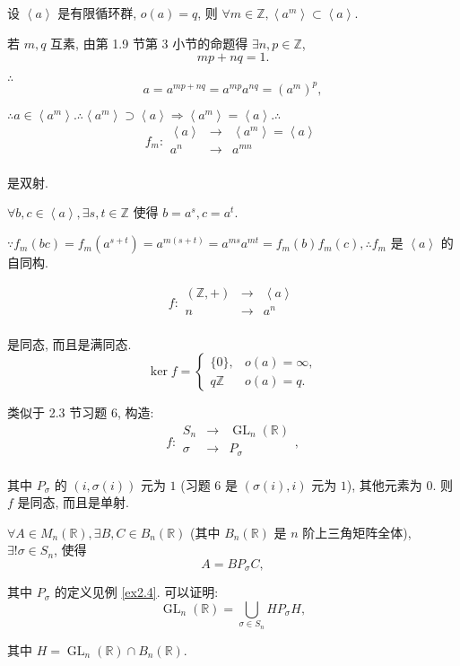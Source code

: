 \documentclass{ctexart}
\begin{document}
\begin{example}
    设 $\left<a\right>$ 是有限循环群, $o(a)=q$, 则 $\forall m\in\mathbb{Z},\left<a^m\right>\subset\left<a\right>$.

    若 $m,q$ 互素, 由第 1.9 节第 3 小节的命题得 $\exists n,p\in\mathbb{Z}$,
    \[mp+nq=1.\]

    $\therefore$
    \[a=a^{mp+nq}=a^{mp}a^{nq}=(a^m)^p,\]

    $\therefore a\in\left<a^m\right>.\therefore\left<a^m\right>\supset\left<a\right>\Rightarrow\left<a^m\right>=\left<a\right>.\therefore$
    \[f_m:\begin{array}{rcl}
        \left<a\right> & \to & \left<a^m\right>=\left<a\right> \\
        a^n & \to & a^{mn} \\
    \end{array}\]

    是双射.

    $\forall b,c\in\left<a\right>,\exists s,t\in\mathbb{Z}$ 使得 $b=a^s,c=a^t$.

    $\because f_m(bc)=f_m(a^{s+t})=a^{m(s+t)}=a^{ms}a^{mt}=f_m(b)f_m(c),\therefore f_m$ 是 $\left<a\right>$ 的自同构.
\end{example}
\begin{example}
    \[f:\begin{array}{rcl}
        (\mathbb{Z},+) & \to & \left<a\right> \\
        n & \to & a^n \\
    \end{array}\]
    
    是同态, 而且是满同态.
    \[\ker f=\begin{cases}
        \{0\}, & o(a)=\infty, \\
        q\mathbb{Z} & o(a)=q.
    \end{cases}\]
\end{example}
\begin{example}\label{ex2.4}
    类似于 2.3 节习题 6, 构造:
    \[f:\begin{array}{rcl}
        S_n & \to & \operatorname{GL}_n(\mathbb{R}) \\
        \sigma & \to & P_\sigma \\
    \end{array},\]

    其中 $P_\sigma$ 的 $(i,\sigma(i))$ 元为 $1$ (习题 6 是 $(\sigma(i),i)$ 元为 $1$), 其他元素为 $0$. 则 $f$ 是同态, 而且是单射.
\end{example}
\begin{example}
    $\forall A\in M_n(\mathbb{R}),\exists B,C\in B_n(\mathbb{R})$ (其中 $B_n(\mathbb{R})$ 是 $n$ 阶上三角矩阵全体), $\exists!\sigma\in S_n$, 使得
    \[A=BP_\sigma C,\]

    其中 $P_\sigma$ 的定义见例 \ref{ex2.4}. 可以证明:
    \[\operatorname{GL}_n(\mathbb{R})=\bigcup\limits_{\sigma\in S_n}HP_\sigma H,\]

    其中 $H=\operatorname{GL}_n(\mathbb{R})\cap B_n(\mathbb{R})$.
\end{example}
\end{document}

